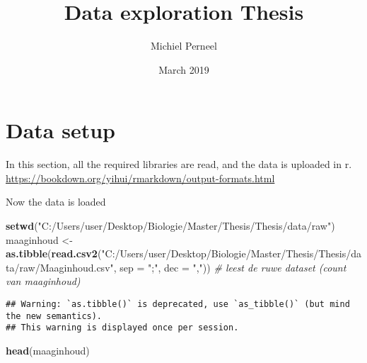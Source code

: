 \documentclass[]{article}
\title{Data exploration Thesis}
\author{Michiel Perneel}
\date{March 2019}
\newenvironment{Shaded}{\begin{snugshade}}{\end{snugshade}}
\newcommand{\KeywordTok}[1]{\textcolor[rgb]{0.13,0.29,0.53}{\textbf{#1}}}
\newcommand{\DataTypeTok}[1]{\textcolor[rgb]{0.13,0.29,0.53}{#1}}
\newcommand{\StringTok}[1]{\textcolor[rgb]{0.31,0.60,0.02}{#1}}
\newcommand{\CommentTok}[1]{\textcolor[rgb]{0.56,0.35,0.01}{\textit{#1}}}
\newcommand{\NormalTok}[1]{#1}
\begin{document}
\maketitle

\section{Data setup}\label{data-setup}

In this section, all the required libraries are read, and the data is
uploaded in r.
\url{https://bookdown.org/yihui/rmarkdown/output-formats.html}

Now the data is loaded

\begin{Shaded}
\begin{Highlighting}[]
\KeywordTok{setwd}\NormalTok{(}\StringTok{"C:/Users/user/Desktop/Biologie/Master/Thesis/Thesis/data/raw"}\NormalTok{)}
\NormalTok{maaginhoud <-}\StringTok{ }\KeywordTok{as.tibble}\NormalTok{(}\KeywordTok{read.csv2}\NormalTok{(}\StringTok{"C:/Users/user/Desktop/Biologie/Master/Thesis/Thesis/data/raw/Maaginhoud.csv"}\NormalTok{, }\DataTypeTok{sep =} \StringTok{";"}\NormalTok{, }\DataTypeTok{dec =} \StringTok{","}\NormalTok{)) }\CommentTok{# leest de ruwe dataset (count van maaginhoud)}
\end{Highlighting}
\end{Shaded}

\begin{verbatim}
## Warning: `as.tibble()` is deprecated, use `as_tibble()` (but mind the new semantics).
## This warning is displayed once per session.
\end{verbatim}

\begin{Shaded}
\begin{Highlighting}[]
\KeywordTok{head}\NormalTok{(maaginhoud)}
\end{Highlighting}
\end{Shaded}
\end{document}
